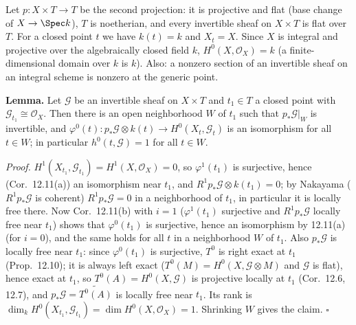 \documentclass[11pt]{article}
\begin{document}
\pf
Let $p\colon X\times T\to T$ be the second projection: it is projective and flat (base change of $X\to\Spec k$), $T$ is noetherian, and every invertible sheaf on $X\times T$ is flat over $T$. For a closed point $t$ we have $k(t)=k$ and $X_t=X$. Since $X$ is integral and projective over the algebraically closed field $k$, $H^0(X,\mathcal O_X)=k$ (a finite-dimensional domain over $k$ is $k$). Also: a nonzero section of an invertible sheaf on an integral scheme is nonzero at the generic point.

\textbf{Lemma.} Let $\mathcal G$ be an invertible sheaf on $X\times T$ and $t_1\in T$ a closed point with $\mathcal G_{t_1}\cong\mathcal O_X$. Then there is an open neighborhood $W$ of $t_1$ such that $p_*\mathcal G|_W$ is invertible, and $\varphi^0(t)\colon p_*\mathcal G\otimes k(t)\to H^0(X_t,\mathcal G_t)$ is an isomorphism for all $t\in W$; in particular $h^0(t,\mathcal G)=1$ for all $t\in W$.

\emph{Proof.} $H^1(X_{t_1},\mathcal G_{t_1})=H^1(X,\mathcal O_X)=0$, so $\varphi^1(t_1)$ is surjective, hence (Cor.~12.11(a)) an isomorphism near $t_1$, and $R^1p_*\mathcal G\otimes k(t_1)=0$; by Nakayama ($R^1p_*\mathcal G$ is coherent) $R^1p_*\mathcal G=0$ in a neighborhood of $t_1$, in particular it is locally free there. Now Cor.~12.11(b) with $i=1$ ($\varphi^1(t_1)$ surjective and $R^1p_*\mathcal G$ locally free near $t_1$) shows that $\varphi^0(t_1)$ is surjective, hence an isomorphism by 12.11(a) (for $i=0$), and the same holds for all $t$ in a neighborhood $W$ of $t_1$. Also $p_*\mathcal G$ is locally free near $t_1$: since $\varphi^0(t_1)$ is surjective, $T^0$ is right exact at $t_1$ (Prop.~12.10); it is always left exact ($T^0(M)=H^0(X,\mathcal G\otimes M)$ and $\mathcal G$ is flat), hence exact at $t_1$, so $T^0(A)=H^0(X,\mathcal G)$ is projective locally at $t_1$ (Cor.~12.6, 12.7), and $p_*\mathcal G=\widetilde{T^0(A)}$ is locally free near $t_1$. Its rank is $\dim_kH^0(X_{t_1},\mathcal G_{t_1})=\dim H^0(X,\mathcal O_X)=1$. Shrinking $W$ gives the claim. \hfill$\square$
\end{document}
